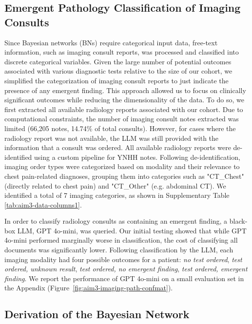 \subsection{Emergent Pathology Classification of Imaging Consults}

Since Bayesian networks (BNs) require categorical input data, free-text information, such as imaging consult reports, was processed and classified into discrete categorical variables. Given the large number of potential outcomes associated with various diagnostic tests relative to the size of our cohort, we simplified the categorization of imaging consult reports to just indicate the presence of any emergent finding. This approach allowed us to focus on clinically significant outcomes while reducing the dimensionality of the data. To do so, we first extracted all available radiology reports associated with our cohort. Due to computational constraints, the number of imaging consult notes extracted was limited (66,205 notes, 14.74\% of total consults). However, for cases where the radiology report was not available, the LLM was still provided with the information that a consult was ordered. All available radiology reports were de-identified using a custom pipeline for YNHH notes. Following de-identification, imaging order types were categorized based on modality and their relevance to chest pain-related diagnoses, grouping them into categories such as "CT\_Chest" (directly related to chest pain) and "CT\_Other" (e.g. abdominal CT). We identified a total of 7 imaging categories, as shown in Supplementary Table \ref{tab:aim3-data-columns1}.

In order to classify radiology consults as containing an emergent finding, a black-box LLM, GPT 4o-mini, was queried. Our initial testing showed that while GPT 4o-mini performed marginally worse in classification, the cost of classifying all documents was significantly lower. Following classification by the LLM, each imaging modality had four possible outcomes for a patient: \emph{no test ordered}, \emph{test ordered, unknown result}, \emph{test ordered, no emergent finding}, \emph{test ordered, emergent finding}. We report the performance of GPT 4o-mini on a small evaluation set in the Appendix (Figure~\ref{fig:aim3-imaging-path-confmat}). 

\subsection{Derivation of the Bayesian Network}

